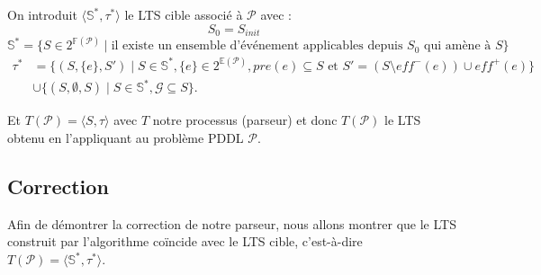 On introduit $\langle \mathds{S}^*, \tau^*\rangle$ le LTS cible associé à $\mathcal{P}$ avec : 
$$S_0 = S_{init} $$
$$\mathds{S^*} = \{S \in 2^{\mathds{F}(\mathcal{P})} \mid \text{il existe un ensemble d'événement applicables depuis } S_0 \text{ qui amène à }S\}$$
\begin{equation*}
    \begin{aligned}
    \tau^* &= \{(S, \{e\}, S') \mid S \in \mathbb{S}^*, \{e\} \in 2^{\mathds{E}(\mathcal{P})}, pre(e) \subseteq S \text{ et } S' = (S \setminus eff^-(e)) \cup eff^+(e)\} \\
    &\cup \{(S, \emptyset, S) \mid S \in \mathbb{S}^*, \mathcal{G} \subseteq S\}.
    \end{aligned}
\end{equation*}

Et $T(\mathcal{P}) = \langle S, \tau \rangle $ avec $T$ notre processus (parseur) et donc $T(\mathcal{P})$ le LTS obtenu en l'appliquant au problème PDDL $\mathcal{P}$.



\subsection{Correction}
Afin de démontrer la correction de notre parseur, nous allons montrer que le LTS construit par l'algorithme coïncide avec le LTS cible, c'est-à-dire $T(\mathcal{P}) = \langle \mathds{S}^*, \tau^* \rangle$.

